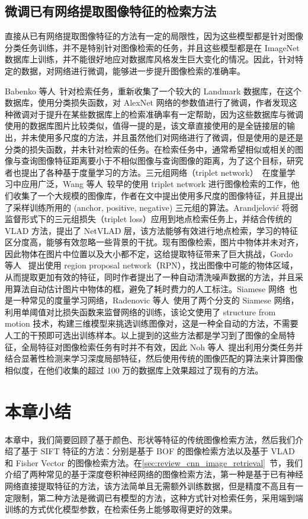 \subsection{微调已有网络提取图像特征的检索方法}

直接从已有网络提取图像特征的方法有一定的局限性，因为这些模型都是针对图像分类任务训练，并不是特别针对图像检索的任务，并且这些模型都是在 ImageNet 数据库上训练，并不能很好地应对数据库风格发生巨大变化的情况。因此，针对特定的数据，对网络进行微调，能够进一步提升图像检索的准确率。

Babenko 等人~\cite{Babenko2014NeuralCF}针对检索任务，重新收集了一个较大的 Landmark 数据库，在这个数据库，使用分类损失函数，对 AlexNet 网络的参数值进行了微调，作者发现这种微调对于提升在某些数据库上的检索准确率有一定帮助，因为这些数据库与微调使用的数据库图片比较类似，值得一提的是，该文章直接使用的是全链接层的输出，并未使用多尺度的方法，并且虽然他们对网络进行了微调，但是使用的是还是分类的损失函数，并未针对检索的任务。在检索任务中，通常希望相似或相关的图像与查询图像特征距离要小于不相似图像与查询图像的距离，为了这个目标，研究者也提出了各种基于度量学习的方法。三元组网络（triplet network）~\cite{Wang2014LearningFI,Schroff2015FaceNetAU}在度量学习中应用广泛，Wang 等人~\cite{Wang2014LearningFI}较早的使用 triplet network 进行图像检索的工作，他们收集了一个大规模的图像库，作者在文中提出使用多尺度的图像特征，并且提出了采样训练所用的 (anchor, positive, negative) 三元组的算法。Arandjelovi{\'c} 将弱监督形式下的三元组损失（triplet loss）应用到地点检索任务上，并结合传统的 VLAD 方法，提出了 NetVLAD 层，该方法能够有效进行地点检索，学习的特征区分度高，能够有效忽略一些背景的干扰。现有图像检索，图片中物体并未对齐，因此物体在图片中位置以及大小都不定，这给提取特征带来了巨大挑战，Gordo 等人~\cite{Gordo2016DeepIR} 提出使用 region proposal network（RPN），找出图像中可能的物体区域，从而提取更加有效的特征，同时作者提出了一种自动清洗噪声数据的方法，并且采用算法自动估计图片中物体的框，避免了耗时费力的人工标注。Siamese 网络~\cite{Bell2015LearningVS,Hadsell2006DimensionalityRB}也是一种常见的度量学习网络，Radenovic 等人~\cite{Radenovic2016CNNIR}使用了两个分支的 Siamese 网络，利用单阈值对比损失函数来监督网络的训练，该论文使用了 structure from motion 技术，构建三维模型来挑选训练图像对，这是一种全自动的方法，不需要人工的干预即可选出训练样本。以上提到的这些方法都是学习到了图像的全局特征，全局特征对图像检索任务有时并不有效，因此 Noh 等人~\cite{Noh2017LargeScaleIR}提出利用分类任务并结合显著性检测来学习深度局部特征，然后使用传统的图像匹配的算法来计算图像相似度，在他们收集的超过 100 万的数据库上效果超过了现有的方法。


\section{本章小结}
本章中，我们简要回顾了基于颜色、形状等特征的传统图像检索方法，然后我们介绍了基于 SIFT 特征的方法：分别是基于 BOF 的图像检索方法以及基于 VLAD 和 Fisher Vector 的图像检索方法。在\ref{sec:review_cnn_image_retrieval}~节，我们介绍了两种常见的基于深度卷积神经网络的图像检索方法，第一种是基于已有神经网络直接提取特征的方法，该方法简单且无需额外训练数据，但是精度不高且有一定限制，第二种方法是微调已有模型的方法，这种方式针对检索任务，采用端到端训练的方式优化模型参数，在检索任务上能够取得更好的效果。
